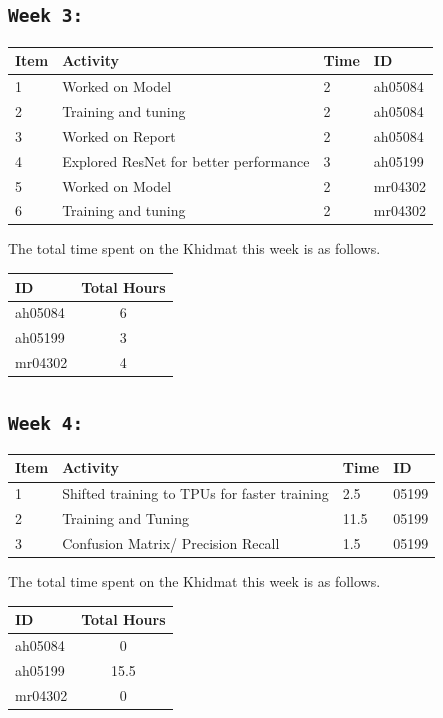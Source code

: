 \documentclass[11pt]{article}
\begin{document}
\subsection{\texttt{Week 3: }}
\begin{center}
\begin{tabular}{|l|l|l|l|}
  \hline
  \textbf{Item} 	& \textbf{Activity} & \textbf{Time} & \textbf{ID} \\\hline
  1 & Worked on Model & 2 & ah05084 \\ \hline
  2 & Training and tuning & 2 & ah05084 \\ \hline
  3 & Worked on Report & 2 & ah05084 \\ \hline
  4 & Explored ResNet for better performance & 3 & ah05199 \\ \hline
  5 & Worked on Model & 2 & mr04302 \\ \hline
  6 & Training and tuning & 2 & mr04302 \\ \hline
\end{tabular}
    
\end{center}
The total time spent on the Khidmat this week is as follows.    

\begin{center}
\begin{tabular}{|l|c|}
  \hline
  \textbf{ID} & \textbf{Total Hours}\\\hline
  ah05084 & 6 \\\hline
  ah05199 & 3 \\\hline
  mr04302 & 4 \\\hline
\end{tabular}
\end{center}
\newpage
\subsection{\texttt{Week 4: }}
\begin{center}
\begin{tabular}{|l|l|l|l|}
  \hline
  \textbf{Item} 	& \textbf{Activity} & \textbf{Time} & \textbf{ID} \\\hline
  
  1 & Shifted training to TPUs for faster training & 2.5 & 05199 \\ \hline
  2 & Training and Tuning & 11.5 & 05199 \\ \hline
  3 & Confusion Matrix/ Precision Recall & 1.5 & 05199 \\ \hline
\end{tabular}
    
\end{center}
The total time spent on the Khidmat this week is as follows.    
\begin{center}
\begin{tabular}{|l|c|}
  \hline
  \textbf{ID} & \textbf{Total Hours}\\\hline
  ah05084 & 0 \\\hline
  ah05199 & 15.5 \\\hline
  mr04302 & 0 \\\hline
\end{tabular}
\end{center}
\newpage
\end{document}
